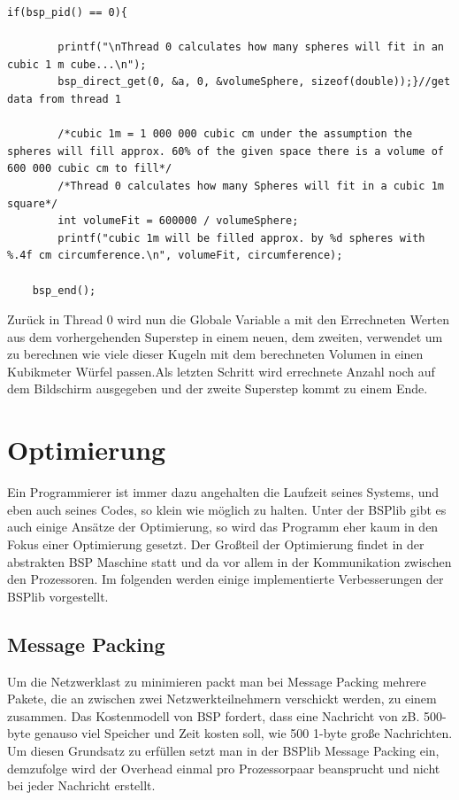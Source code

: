 \documentclass[a4paper,10pt]{scrartcl}
\begin{document}
\begin{lstlisting}
if(bsp_pid() == 0){
    
	    printf("\nThread 0 calculates how many spheres will fit in an cubic 1 m cube...\n");                 
        bsp_direct_get(0, &a, 0, &volumeSphere, sizeof(double));}//get data from thread 1     
    
        /*cubic 1m = 1 000 000 cubic cm under the assumption the spheres will fill approx. 60% of the given space there is a volume of 600 000 cubic cm to fill*/
        /*Thread 0 calculates how many Spheres will fit in a cubic 1m square*/
        int volumeFit = 600000 / volumeSphere;
        printf("cubic 1m will be filled approx. by %d spheres with %.4f cm circumference.\n", volumeFit, circumference);
    
    bsp_end();
\end{lstlisting}
Zurück in Thread 0 wird nun die Globale Variable a mit den Errechneten Werten aus dem vorhergehenden Superstep in einem neuen, dem	 zweiten,  verwendet um zu berechnen wie viele dieser Kugeln mit dem berechneten Volumen in einen Kubikmeter Würfel passen.Als letzten Schritt wird errechnete Anzahl noch auf dem Bildschirm ausgegeben und der zweite Superstep kommt zu einem Ende.	
\newpage

\section{Optimierung}
Ein Programmierer ist immer dazu angehalten die Laufzeit seines Systems, und eben auch seines Codes, so klein wie möglich zu halten. Unter der BSPlib gibt es auch einige Ansätze der Optimierung, so wird das Programm eher kaum in den Fokus einer Optimierung gesetzt. Der Großteil der Optimierung findet in der abstrakten BSP Maschine statt und da vor allem in der Kommunikation zwischen den Prozessoren. Im folgenden werden einige implementierte Verbesserungen der BSPlib vorgestellt.

\subsection{Message Packing}
Um die Netzwerklast zu minimieren packt man bei Message Packing mehrere Pakete, die an zwischen zwei Netzwerkteilnehmern verschickt werden, zu einem zusammen. Das Kostenmodell von BSP fordert, dass eine Nachricht von zB. 500-byte genauso viel Speicher und Zeit kosten soll, wie 500 1-byte große Nachrichten. Um diesen Grundsatz zu erfüllen setzt man in der BSPlib Message Packing ein, demzufolge wird der Overhead einmal pro Prozessorpaar beansprucht und nicht bei jeder Nachricht erstellt.
\end{document}
